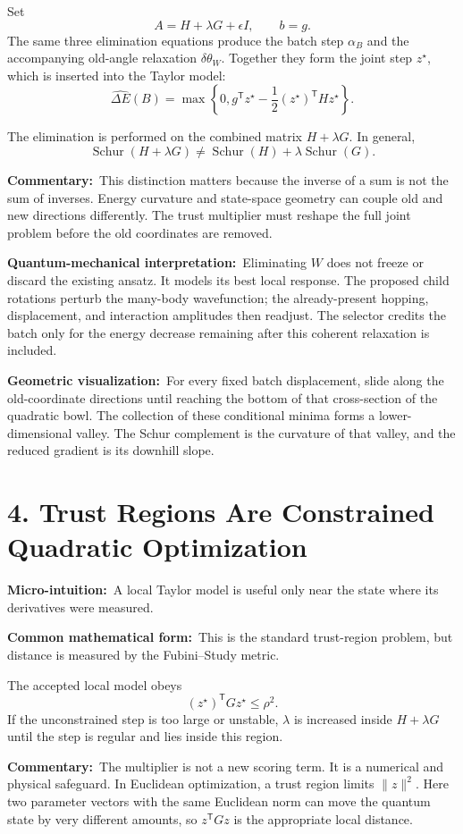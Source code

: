 \documentclass[10pt,twocolumn]{article}
\newcommand{\micro}[1]{\par\noindent\textbf{Micro-intuition:}\ #1\par}
\newcommand{\form}[1]{\par\noindent\textbf{Common mathematical form:}\ #1\par}
\newcommand{\commentary}[1]{\par\noindent\textbf{Commentary:}\ #1\par}
\newcommand{\phys}[1]{\par\noindent\textbf{Quantum-mechanical interpretation:}\ #1\par}
\newcommand{\geom}[1]{\par\noindent\textbf{Geometric visualization:}\ \textcolor{teal!70!black}{#1}\par}
\begin{document}
Set
\[
A=H+\lambda G+\epsilon I,
\qquad b=g.
\]
The same three elimination equations produce the batch step \(\alpha_B\) and
the accompanying old-angle relaxation \(\delta\theta_W\). Together they form
the joint step \(z^\star\), which is inserted into the Taylor model:
\[
\boxed{
\widehat{\Delta E}(B)
=\max\left\{0,
g^{\mathsf T}z^\star
-\frac12(z^\star)^{\mathsf T}Hz^\star
\right\}.
}
\]

The elimination is performed on the combined matrix \(H+\lambda G\). In
general,
\[
\operatorname{Schur}(H+\lambda G)
\ne
\operatorname{Schur}(H)+\lambda\operatorname{Schur}(G).
\]

\commentary{This distinction matters because the inverse of a sum is not the
sum of inverses. Energy curvature and state-space geometry can couple old and
new directions differently. The trust multiplier must reshape the full joint
problem before the old coordinates are removed.}

\phys{Eliminating \(W\) does not freeze or discard the existing ansatz. It
models its best local response. The proposed child rotations perturb the
many-body wavefunction; the already-present hopping, displacement, and
interaction amplitudes then readjust. The selector credits the batch only for
the energy decrease remaining after this coherent relaxation is included.}

\geom{For every fixed batch displacement, slide along the old-coordinate
directions until reaching the bottom of that cross-section of the quadratic
bowl. The collection of these conditional minima forms a lower-dimensional
valley. The Schur complement is the curvature of that valley, and the reduced
gradient is its downhill slope.}

\section*{4. Trust Regions Are Constrained Quadratic Optimization}

\micro{A local Taylor model is useful only near the state where its derivatives
were measured.}

\form{This is the standard trust-region problem, but distance is measured by
the Fubini--Study metric.}

The accepted local model obeys
\[
(z^\star)^{\mathsf T}Gz^\star\le\rho^2.
\]
If the unconstrained step is too large or unstable, \(\lambda\) is increased
inside \(H+\lambda G\) until the step is regular and lies inside this region.

\commentary{The multiplier is not a new scoring term. It is a numerical and
physical safeguard. In Euclidean optimization, a trust region limits
\(\|z\|^2\). Here two parameter vectors with the same Euclidean norm can move
the quantum state by very different amounts, so \(z^{\mathsf T}Gz\) is the
appropriate local distance.}
\end{document}
